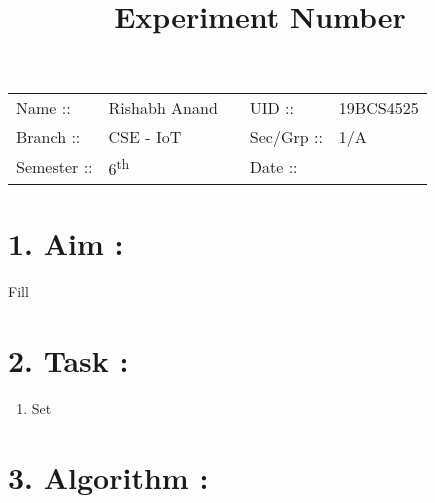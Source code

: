 \documentclass[14pt]{extarticle}
\title{%
    \textbf{
    \vspace{-3em} \\
    \Large Experiment Number\\
    \vspace{-4em}
    }
}
\author{}
\date{}
\begin{document}
\maketitle %

\section*{}
    \begin{tabular}{ llp{2cm}ll }
        Name :: & Rishabh Anand & & UID :: & 19BCS4525  \\
        Branch :: & CSE - IoT & & Sec/Grp :: & 1/A \\
        Semester :: & 6\textsuperscript{th} & & Date :: & \shortdate{\today} \\
    \end{tabular}

\vspace{1em}

\section*{\normalsize 1. Aim :}

Fill

\section*{\normalsize 2. Task :}

\begin{enumerate}
  \item Set
\end{enumerate}


\section*{\normalsize 3. Algorithm :}
\end{document}
